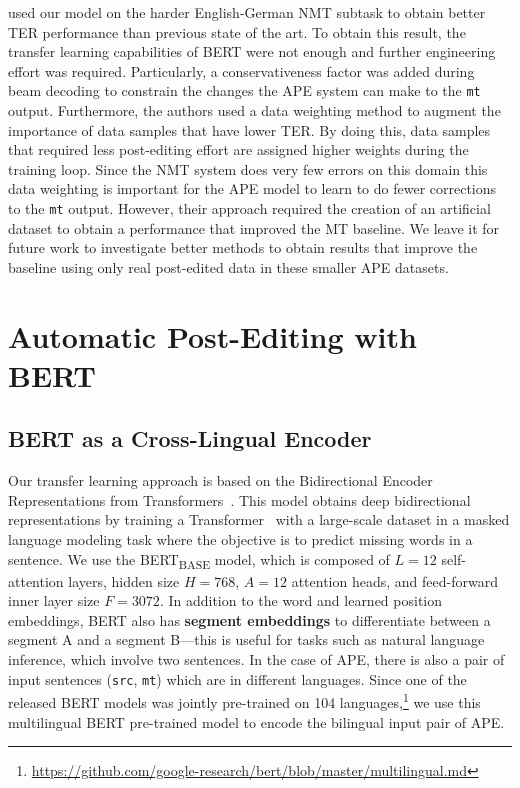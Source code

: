 \citet{lopes2019unbabels} used our model on the harder
English-German NMT subtask to obtain better TER performance than
previous state of the art. To obtain this result, the transfer
learning capabilities of BERT were not enough and further engineering
effort was required. Particularly, a conservativeness factor was
added during beam decoding to constrain the changes the APE system
can make to the {\tt mt} output. Furthermore, the authors used a data
weighting method to augment the importance of data samples that have
lower TER. By doing this, data samples that required less
post-editing effort are assigned higher weights during the training
loop. Since the NMT system does very few errors on this domain this
data weighting is important for the APE model to learn to do fewer
corrections to the {\tt mt} output. However, their approach required
the creation of an artificial dataset to obtain a performance that
improved the MT baseline. We leave it for future work to investigate
better methods to obtain results that improve the baseline using only
real post-edited data in these smaller APE datasets.

\section{Automatic Post-Editing with BERT}\label{sec:ape_bert}

\subsection{BERT as a Cross-Lingual Encoder}

Our transfer learning approach is based on the Bidirectional Encoder
Representations from Transformers~\citep[BERT;][]{devlin2018bert}.
This model obtains deep bidirectional representations by training a
Transformer~\citep{vaswani2017attention} with a large-scale dataset
in a masked language modeling task where the objective is to predict
missing words in a sentence. We use the BERT\textsubscript{BASE}
model, which is composed of $L=12$ self-attention layers, hidden size
$H=768$, $A=12$ attention heads, and feed-forward inner layer size
$F=3072$. In addition to the word and learned position embeddings,
BERT also has {\bf segment embeddings} to differentiate between a
segment A and a segment B---this is useful for tasks such as natural
language inference, which involve two sentences. In the case of APE,
there is also a pair of input sentences ({\tt src}, {\tt mt}) which
are in different languages. Since one of the released BERT models was
jointly pre-trained on 104 languages,\footnote{
  \url{https://github.com/google-research/bert/blob/master/multilingual.md}}
we use this multilingual BERT pre-trained model to encode the
bilingual input pair of APE.

